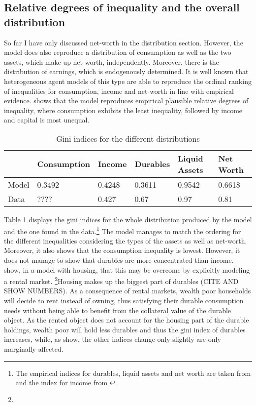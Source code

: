 \documentclass[a4paper,12pt,legno]{article}
\begin{document}
\subsection{Relative degrees of inequality and the overall distribution}
So far I have only discussed net-worth in the distribution section. However, the model does also reproduce a distribution of consumption as well as the two assets, which make up net-worth, independently. Moreover, there is the distribution of earnings, which is endogenously determined. It is well known that heterogeneous agent models of this type are able to reproduce the ordinal ranking of inequalities for consumption, income and net-worth in line with empirical evidence.\cite{aiyagari1994} shows that the model reproduces empirical plausible relative degrees of inequality, where consumption exhibits the least inequality, followed by income and capital is most unequal. 

\begin{table}[!htbp]
\centering
\caption{Gini indices for the different distributions}
\label{Gini_Ranking}
\begin{tabular}{@{}llllll@{}}
\toprule
      & Consumption & Income & Durables & Liquid Assets & Net Worth \\ \midrule
Model & 0.3492      & 0.4248 & 0.3611   & 0.9542        & 0.6618    \\ \midrule
Data  & ????        & 0.427  & 0.67     & 0.97          & 0.81      \\ \bottomrule
\end{tabular}
\end{table}

Table \ref{Gini_Ranking} displays the gini indices for the whole distribution produced by the model and the one found in the data.\footnote{The empirical indices for durables, liquid assets and net worth are taken from \cite{hintermaier2010} and the index for income from \cite{hintermaier2011}} The model manages to match the ordering for the different inequalities considering the types of the assets as well as net-worth. Moreover, it also shows that the consumption inequality is lowest. However, it does not manage to show that durables are more concentrated than income. \cite{diaz2010} show, in a model with housing, that this may be overcome by explicitly modeling a rental market. \footnote{}Housing makes up the biggest part of durables (CITE AND SHOW NUMBERS). As a consequence of rental markets, wealth poor households will decide to rent instead of owning, thus satisfying their durable consumption needs without being able to benefit from the collateral value of the durable object. As the rented object does not account for the housing part of the durable holdings, wealth poor will hold less durables and thus the gini index of durables increases, while, as \cite{diaz2010} show, the other indices change only slightly are only marginally affected. 
\end{document}
